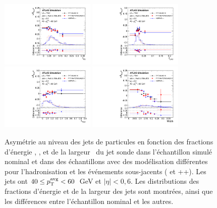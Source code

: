 \begin{figure}[ht!]
\centering
\includegraphics[width=0.4\textwidth]{figures/fig_48a.pdf}
\hspace{1.cm}
\includegraphics[width=0.4\textwidth]{figures/fig_48b.pdf}\\
\includegraphics[width=0.4\textwidth]{figures/fig_48c.pdf}
\hspace{1.cm}
\includegraphics[width=0.4\textwidth]{figures/fig_48d.pdf}
\caption{Asym\'etrie au niveau des jets de particules en fonction des fractions d'\'energie \fpres{}, \fem{}, \ftile{} et de la largeur \width~du jet sonde dans l'\'echantillon simul\'e nominal et dans des \'echantillons avec des mod\'elisation diff\'erentes pour l'hadronisation et les \'ev\'enements sous-jacents ( et \herwig++). Les jets ont $40 \le p_{\mathrm{T}}^{\rm avg} < 60$~GeV et $|\eta| < 0,6$. Les distributions des fractions d'\'energie et de la largeur des jets sont montr\'ees, ainsi que les diff\'erences entre l'\'echantillon nominal et les autres.}
\label{fig:AtruthAllSamples}
\end{figure}

